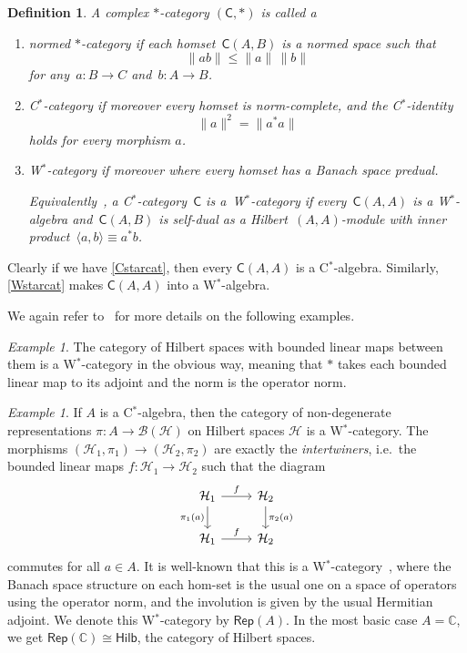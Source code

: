 \documentclass[reqno,T1,11pt]{amsproc}
\renewcommand{\H}{\mathcal{H}}	%
\newcommand{\B}[1]{\mathcal{B}(#1)}	%
\newcommand{\C}{\mathbb{C}}
\newcommand{\cat}[1]{\mathsf{#1}}		%
\newcommand{\Hilb}{\mathsf{Hilb}} 		%
\newcommand{\Rep}[1]{\mathsf{Rep}(#1)}		%
\theoremstyle{plain}
\newtheorem{defn}[thm]{Definition}
\theoremstyle{remark}
\newtheorem{ex}[thm]{Example}
\numberwithin{equation}{section}
\begin{document}
\begin{defn}
A complex $*$-category $(\cat{C},*)$ is called a
\begin{enumerate}
	\item \emph{normed $*$-category} if each homset~$\cat{C}(A,B)$ is a normed space such that
	    \[
		    \| ab \| \leq \|a\| \, \|b\|
	    \]
                for any~$a\colon B \to C$ and~$b\colon A \to B$.
	\item\label{Cstarcat}
    \emph{C$^*$-category} if moreover every homset is norm-complete, and the C$^*$-identity
    \[
	\|a \|^2 = \|a^*a\|
     \]
	holds for every morphism $a$.
\item\label{Wstarcat}
    \emph{W$^*$-category} if moreover
        where every homset has a Banach space predual.
        
	Equivalently~\cite[Prop.~2.15]{wstarcat}, a C$^*$-category~$\cat{C}$
            is a~W$^*$-category
            if every~$\cat{C}(A,A)$ is a W$^*$-algebra
            and~$\cat{C}(A,B)$ is self-dual
            as a Hilbert~$(A,A)$-module
            with inner product~$\langle a,b\rangle \equiv a^*b$.
\end{enumerate}
\end{defn}

Clearly if we have \ref{Cstarcat}, then every $\cat{C}(A,A)$ is a C$^*$-algebra. Similarly, \ref{Wstarcat} makes $\cat{C}(A,A)$ into a W$^*$-algebra.

We again refer to~\cite{wstarcat} for more details on the following examples.

\begin{ex}
The category of Hilbert spaces with bounded linear maps between them
    is a W$^*$-category in the obvious way, meaning that $*$ takes each bounded linear map to its adjoint and the norm is the operator norm.
\end{ex}

\begin{ex}
\label{rep_ex}
If $A$ is a C$^*$-algebra, then the category of non-degenerate representations $\pi : A \to \B{\H}$ on Hilbert spaces $\H$ is a W$^*$-category. The morphisms $(\H_1,\pi_1) \to (\H_2,\pi_2)$ are exactly the \emph{intertwiners}, i.e.~the bounded linear maps $f : \H_1 \to \H_2$ such that the diagram
\[\begin{tikzcd}
	\H_1 \ar{r}{f} \ar[swap]{d}{\pi_1(a)} & \H_2 \ar{d}{\pi_2(a)} \\
	\H_1 \ar{r}{f} & \H_2
\end{tikzcd}\]
commutes for all $a\in A$. It is well-known that this is a W$^*$-category~\cite[Example~2.4]{wstarcat}, where the Banach space structure on each hom-set is the usual one on a space of operators using the operator norm, and the involution is given by the usual Hermitian adjoint. We denote this W$^*$-category by $\Rep{A}$. In the most basic case $A = \C$, we get $\Rep{\C} \cong \Hilb$, the category of Hilbert spaces.
\end{ex}
\end{document}
